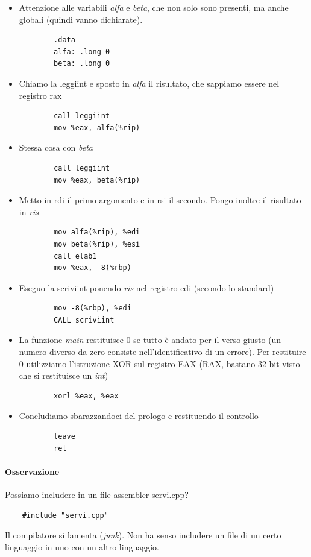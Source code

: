 \begin{itemize}
\begin{itemize}
\begin{framed}
\begin{center}
			\end{center}
		\end{framed}
	\end{itemize}
	\item Attenzione alle variabili \emph{alfa} e \emph{beta}, che non solo sono presenti, ma anche globali (quindi vanno dichiarate).
	\begin{verbatim}
		.data
		alfa: .long 0
		beta: .long 0
	\end{verbatim}
	\item Chiamo la leggiint e sposto in \emph{alfa} il risultato, che sappiamo essere nel registro rax
	\begin{verbatim}
		call leggiint
		mov %eax, alfa(%rip)
	\end{verbatim}
	\item Stessa cosa con \emph{beta}
	\begin{verbatim}
		call leggiint
		mov %eax, beta(%rip)
	\end{verbatim}
	\item Metto in rdi il primo argomento e in rsi il secondo. Pongo inoltre il risultato in \emph{ris}
	\begin{verbatim}
		mov alfa(%rip), %edi
		mov beta(%rip), %esi
		call elab1
		mov %eax, -8(%rbp)
	\end{verbatim}
	\item Eseguo la scriviint ponendo \emph{ris} nel registro edi (secondo lo standard)
	\begin{verbatim}
		mov -8(%rbp), %edi
		CALL scriviint
	\end{verbatim}
	\item La funzione \emph{main} restituisce $0$ se tutto è andato per il verso giusto (un numero diverso da zero consiste nell'identificativo di un errore). Per restituire $0$ utilizziamo l'istruzione XOR sul registro EAX (RAX, bastano 32 bit visto che si restituisce un \emph{int})
	\begin{verbatim}
		xorl %eax, %eax
	\end{verbatim}
	\item Concludiamo sbarazzandoci del prologo e restituendo il controllo
	\begin{verbatim}
		leave
		ret
	\end{verbatim}
\end{itemize}
\paragraph{Osservazione} Possiamo includere in un file assembler servi.cpp?
\begin{verbatim}
	#include "servi.cpp"
\end{verbatim}
Il compilatore si lamenta (\emph{junk}). Non ha senso includere un file di un certo linguaggio in uno con un altro linguaggio. 
